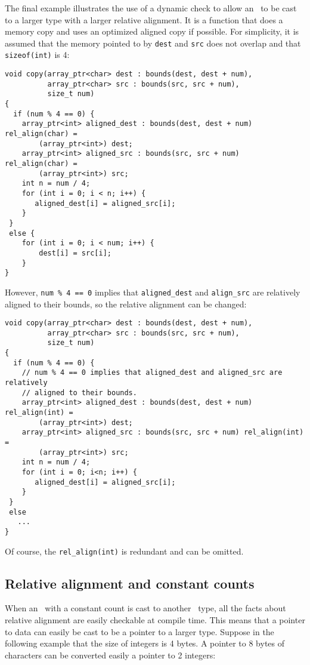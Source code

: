The final example illustrates the use of a dynamic check to allow an
\arrayptrchar\ to be cast to a larger type with a larger relative alignment.
It is a function that does a memory copy and uses an optimized aligned copy if
possible.  For simplicity, it is assumed that the memory pointed to by
\texttt{dest} and \texttt{src} does not overlap and that \texttt{sizeof(int)} is 4:
\begin{verbatim}
void copy(array_ptr<char> dest : bounds(dest, dest + num),
          array_ptr<char> src : bounds(src, src + num), 
          size_t num)
{
  if (num % 4 == 0) {
    array_ptr<int> aligned_dest : bounds(dest, dest + num) rel_align(char) =
        (array_ptr<int>) dest;
    array_ptr<int> aligned_src : bounds(src, src + num) rel_align(char) =
        (array_ptr<int>) src;
    int n = num / 4;
    for (int i = 0; i < n; i++) {
       aligned_dest[i] = aligned_src[i];
    }
 }
 else {
    for (int i = 0; i < num; i++) {
        dest[i] = src[i];
    }
}
\end{verbatim}

However, \texttt{num \% 4 == 0} implies that \texttt{aligned\_dest} and
\texttt{align\_src} are relatively aligned to their bounds, so the
relative alignment can be changed:

\begin{verbatim}
void copy(array_ptr<char> dest : bounds(dest, dest + num),
          array_ptr<char> src : bounds(src, src + num), 
          size_t num)
{
  if (num % 4 == 0) {
    // num % 4 == 0 implies that aligned_dest and aligned_src are relatively
    // aligned to their bounds.
    array_ptr<int> aligned_dest : bounds(dest, dest + num) rel_align(int) =
        (array_ptr<int>) dest;
    array_ptr<int> aligned_src : bounds(src, src + num) rel_align(int) =
        (array_ptr<int>) src;
    int n = num / 4;
    for (int i = 0; i<n; i++) {
       aligned_dest[i] = aligned_src[i];
    }
 }
 else  
   ...
}
\end{verbatim}

Of course, the \texttt{rel\_align(int)} is redundant and can be omitted.

\subsection{Relative alignment and constant counts}

When an \arrayptr\ with a constant count is cast to another
\arrayptr\ type, all the facts about relative alignment are
easily checkable at compile time. This means that a pointer to data can
easily be cast to be a pointer to a larger type. Suppose in the
following example that the size of integers is 4 bytes. A pointer to 8
bytes of characters can be converted easily a pointer to 2 integers:

